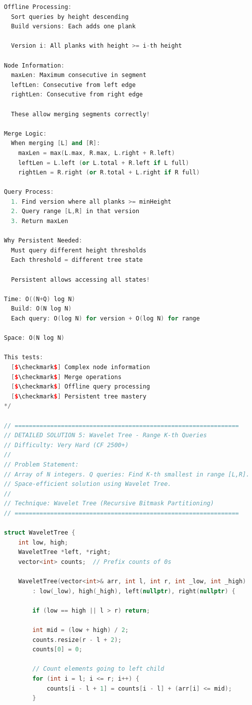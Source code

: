 \documentclass[11pt,a4paper,oneside]{book}
\begin{document}
\begin{lstlisting}[language=C++, caption=10+ COMPLETE DETAILED SOLUTIONS]
Offline Processing:
  Sort queries by height descending
  Build versions: Each adds one plank
  
  Version i: All planks with height >= i-th height

Node Information:
  maxLen: Maximum consecutive in segment
  leftLen: Consecutive from left edge
  rightLen: Consecutive from right edge
  
  These allow merging segments correctly!

Merge Logic:
  When merging [L] and [R]:
    maxLen = max(L.max, R.max, L.right + R.left)
    leftLen = L.left (or L.total + R.left if L full)
    rightLen = R.right (or R.total + L.right if R full)

Query Process:
  1. Find version where all planks >= minHeight
  2. Query range [L,R] in that version
  3. Return maxLen

Why Persistent Needed:
  Must query different height thresholds
  Each threshold = different tree state
  
  Persistent allows accessing all states!

Time: O((N+Q) log N)
  Build: O(N log N)
  Each query: O(log N) for version + O(log N) for range

Space: O(N log N)

This tests:
  [$\checkmark$] Complex node information
  [$\checkmark$] Merge operations
  [$\checkmark$] Offline query processing
  [$\checkmark$] Persistent tree mastery
*/

// ===============================================================
// DETAILED SOLUTION 5: Wavelet Tree - Range K-th Queries
// Difficulty: Very Hard (CF 2500+)
//
// Problem Statement:
// Array of N integers. Q queries: Find K-th smallest in range [L,R].
// Space-efficient solution using Wavelet Tree.
//
// Technique: Wavelet Tree (Recursive Bitmask Partitioning)
// ===============================================================

struct WaveletTree {
    int low, high;
    WaveletTree *left, *right;
    vector<int> counts;  // Prefix counts of 0s
    
    WaveletTree(vector<int>& arr, int l, int r, int _low, int _high) 
        : low(_low), high(_high), left(nullptr), right(nullptr) {
        
        if (low == high || l > r) return;
        
        int mid = (low + high) / 2;
        counts.resize(r - l + 2);
        counts[0] = 0;
        
        // Count elements going to left child
        for (int i = l; i <= r; i++) {
            counts[i - l + 1] = counts[i - l] + (arr[i] <= mid);
        }
        

\end{lstlisting}
\end{document}
